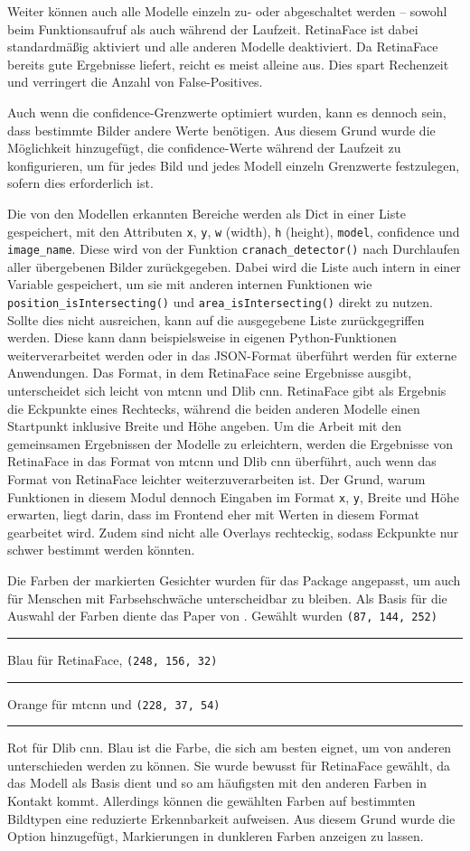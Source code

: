 Weiter können auch alle Modelle einzeln zu- oder abgeschaltet werden – sowohl beim Funktionsaufruf als auch während der Laufzeit. RetinaFace ist dabei standardmäßig aktiviert und alle anderen Modelle deaktiviert. Da RetinaFace bereits gute Ergebnisse liefert, reicht es meist alleine aus. Dies spart Rechenzeit und verringert die Anzahl von False-Positives.

Auch wenn die \gls{confidence}-Grenzwerte optimiert wurden, kann es dennoch sein, dass bestimmte Bilder andere Werte benötigen. Aus diesem Grund wurde die Möglichkeit hinzugefügt, die \gls{confidence}-Werte während der Laufzeit zu konfigurieren, um für jedes Bild und jedes Modell einzeln Grenzwerte festzulegen, sofern dies erforderlich ist.

Die von den Modellen erkannten Bereiche werden als Dict in einer Liste gespeichert, mit den Attributen \texttt{x}, \texttt{y}, \texttt{w} (width), \texttt{h} (height), \texttt{model}, \gls{confidence} und \texttt{image\_name}. Diese wird von der Funktion \texttt{cranach\_detector()} nach Durchlaufen aller übergebenen Bilder zurückgegeben. Dabei wird die Liste auch intern in einer Variable gespeichert, um sie mit anderen internen Funktionen wie \texttt{position\_isIntersecting()} und \texttt{area\_isIntersecting()} direkt zu nutzen. Sollte dies nicht ausreichen, kann auf die ausgegebene Liste zurückgegriffen werden. Diese kann dann beispielsweise in eigenen Python-Funktionen weiterverarbeitet werden oder in das JSON-Format überführt werden für externe Anwendungen. Das Format, in dem RetinaFace seine Ergebnisse ausgibt, unterscheidet sich leicht von \gls{mtcnn} und Dlib \gls{cnn}. RetinaFace gibt als Ergebnis die Eckpunkte eines Rechtecks, während die beiden anderen Modelle einen Startpunkt inklusive Breite und Höhe angeben. Um die Arbeit mit den gemeinsamen Ergebnissen der Modelle zu erleichtern, werden die Ergebnisse von RetinaFace in das Format von \gls{mtcnn} und Dlib \gls{cnn} überführt, auch wenn das Format von RetinaFace leichter weiterzuverarbeiten ist. Der Grund, warum Funktionen in diesem Modul dennoch Eingaben im Format \texttt{x}, \texttt{y}, Breite und Höhe erwarten, liegt darin, dass im Frontend eher mit Werten in diesem Format gearbeitet wird. Zudem sind nicht alle Overlays rechteckig, sodass Eckpunkte nur schwer bestimmt werden könnten.

Die Farben der markierten Gesichter wurden für das Package angepasst, um auch für Menschen mit Farbsehschwäche unterscheidbar zu bleiben. Als Basis für die Auswahl der Farben diente das Paper von \cite{abs-2107-02270}. Gewählt wurden \texttt{(87, 144, 252)} \textcolor{PetroffBlue}{\rule{1em}{1em}} Blau für RetinaFace, \texttt{(248, 156, 32)} \textcolor{PetroffOrange}{\rule{1em}{1em}} Orange für \gls{mtcnn} und \texttt{(228, 37, 54)} \textcolor{PetroffRed}{\rule{1em}{1em}} Rot für Dlib \gls{cnn}. Blau ist die Farbe, die sich am besten eignet, um von anderen unterschieden werden zu können. Sie wurde bewusst für RetinaFace gewählt, da das Modell als Basis dient und so am häufigsten mit den anderen Farben in Kontakt kommt. Allerdings können die gewählten Farben auf bestimmten Bildtypen eine reduzierte Erkennbarkeit aufweisen. Aus diesem Grund wurde die Option hinzugefügt, Markierungen in dunkleren Farben anzeigen zu lassen.


